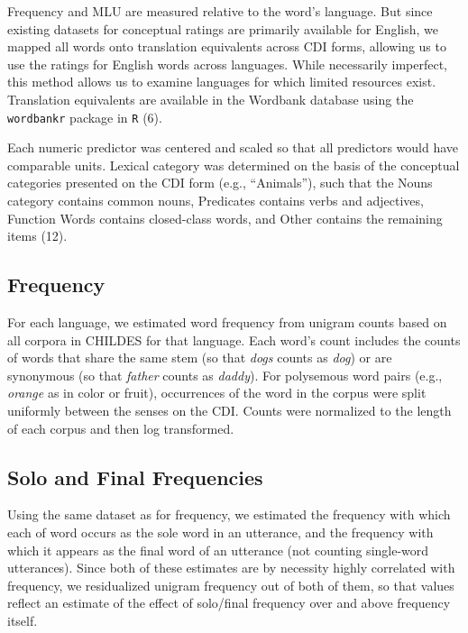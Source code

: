 \documentclass[9pt,twocolumn,twoside]{pnas-new}
\begin{document}
Frequency and MLU are measured relative to the word's language. But
since existing datasets for conceptual ratings are primarily available
for English, we mapped all words onto translation equivalents across CDI
forms, allowing us to use the ratings for English words across
languages. While necessarily imperfect, this method allows us to examine
languages for which limited resources exist. Translation equivalents are
available in the Wordbank database using the \texttt{wordbankr} package
in \texttt{R} (6).

Each numeric predictor was centered and scaled so that all predictors
would have comparable units. Lexical category was determined on the
basis of the conceptual categories presented on the CDI form (e.g.,
``Animals''), such that the Nouns category contains common nouns,
Predicates contains verbs and adjectives, Function Words contains
closed-class words, and Other contains the remaining items (12).

\subsection{Frequency}\label{frequency}

For each language, we estimated word frequency from unigram counts based
on all corpora in CHILDES for that language. Each word's count includes
the counts of words that share the same stem (so that \emph{dogs} counts
as \emph{dog}) or are synonymous (so that \emph{father} counts as
\emph{daddy}). For polysemous word pairs (e.g., \emph{orange} as in
color or fruit), occurrences of the word in the corpus were split
uniformly between the senses on the CDI. Counts were normalized to the
length of each corpus and then log transformed.

\subsection{Solo and Final
Frequencies}\label{solo-and-final-frequencies}

Using the same dataset as for frequency, we estimated the frequency with
which each of word occurs as the sole word in an utterance, and the
frequency with which it appears as the final word of an utterance (not
counting single-word utterances). Since both of these estimates are by
necessity highly correlated with frequency, we residualized unigram
frequency out of both of them, so that values reflect an estimate of the
effect of solo/final frequency over and above frequency itself.
\end{document}
